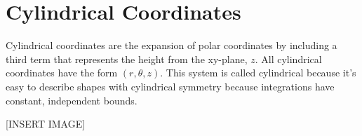 \section{Cylindrical Coordinates}
\noindent
Cylindrical coordinates are the expansion of polar coordinates by including a third term that represents the height from the xy-plane, $z$. All cylindrical coordinates have the form $(r, \theta, z)$. This system is called cylindrical because it’s easy to describe shapes with cylindrical symmetry because integrations have constant, independent bounds.

[INSERT IMAGE]


